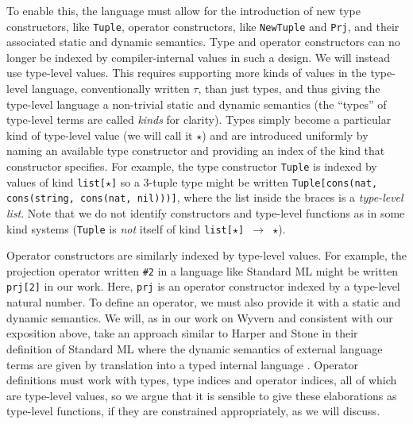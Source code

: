 To enable this, the language must allow for the introduction of new type constructors, like \verb|Tuple|, operator constructors, like \verb|NewTuple| and \verb|Prj|, and their associated static and dynamic semantics. Type and operator constructors can no longer be indexed by compiler-internal values in such a design. 
We will instead use type-level values. This requires supporting more kinds of values in the type-level language, conventionally written $\tau$, than just types, and thus giving the type-level language a non-trivial static and dynamic semantics (the ``types'' of type-level terms are called \emph{kinds} for clarity). Types simply become a particular kind of type-level value (we will call it $\star$) and are introduced uniformly by naming an available type constructor and providing an index of the kind that constructor specifies. For example, the type constructor \verb|Tuple| is indexed by values of kind \verb|list[|$\star$\verb|]| so a 3-tuple type might be written \verb|Tuple[cons(nat, cons(string, cons(nat, nil)))]|, where the list inside the braces is a \emph{type-level list}. Note that we do not identify constructors and type-level functions as in some kind systems (\verb|Tuple| is \emph{not} itself of kind \verb|list[|$\star$\verb|] |$\rightarrow$\verb| |$\star$). 

Operator constructors are similarly indexed by type-level values. For example, the projection operator written \verb|#2| in a language like Standard ML might be written \verb|prj[2]| in our work. Here, \verb|prj| is an operator constructor indexed by a type-level natural number. 
To define an operator, we must also provide it with a static and dynamic semantics. We will, as in our work on Wyvern and consistent with our exposition above, take an approach similar to Harper and Stone in their definition of Standard ML where the dynamic semantics of external language terms are given by translation into a  typed internal language \cite{Harper00atype-theoretic}. Operator definitions must work with types, type indices and operator indices, all of which are type-level values, so we argue that it is sensible to give these elaborations as type-level functions, if they are constrained appropriately, as we will discuss.

